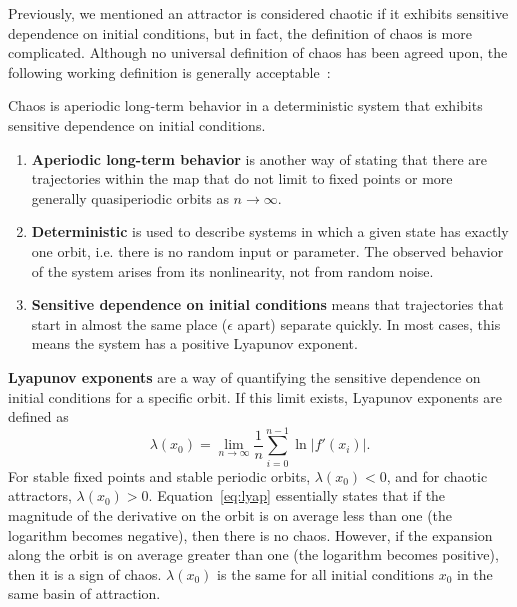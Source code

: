 Previously, we mentioned an attractor is considered chaotic if it
exhibits sensitive dependence on initial conditions, but in fact, the
definition of chaos is more complicated. Although no universal definition of chaos has been
agreed upon, the following working definition is generally acceptable~\cite{strogatz}:
\begin{singlespace}
\begin{definition}
Chaos is aperiodic long-term behavior in a deterministic
  system that exhibits sensitive dependence on initial conditions.
\end{definition}
\end{singlespace}
\begin{enumerate}
\item \textbf{Aperiodic long-term behavior} is another way of stating
  that there are trajectories within the map that do not limit to
  fixed points or more generally quasiperiodic orbits as $n \to \infty$.
\item \textbf{Deterministic} is used to describe systems in which a
  given state has exactly one orbit, i.e. there is no random input or parameter. The observed behavior of the
  system arises from its nonlinearity, not from random noise.
\item \textbf{Sensitive dependence on initial conditions} means that
  trajectories that start in almost the same place ($\epsilon$ apart)
  separate quickly. In most cases, this means the system has a
  positive Lyapunov exponent.
\end{enumerate}

\textbf{Lyapunov exponents} are a way of quantifying the sensitive
dependence on initial conditions for a specific orbit. If this limit
exists, Lyapunov exponents are defined as 
\begin{equation}\label{eq:lyap}
\lambda(x_0) = \lim_{n \to \infty} \frac{1}{n} \sum_{i=0}^{n-1} \ln |f'(x_i)|.
\end{equation}
For stable fixed points and stable periodic orbits, $\lambda(x_0) < 0$,
and for chaotic attractors, $\lambda(x_0)>0$. Equation~\ref{eq:lyap} essentially states that if the magnitude of the
derivative on the orbit is on average less than one (the logarithm
becomes negative), then there is no chaos. However, if the expansion
along the orbit is on average greater than one (the logarithm becomes positive), then it is a
sign of chaos. $\lambda(x_0)$ is the same for all initial conditions
$x_0$ in the same basin of attraction. 

